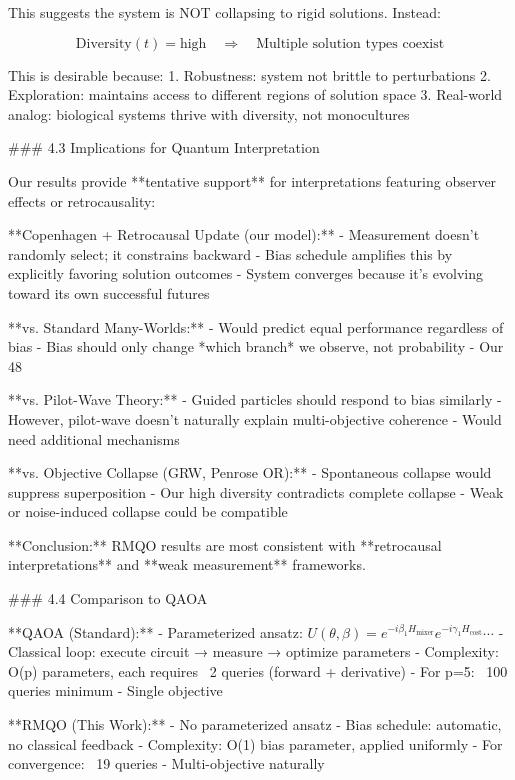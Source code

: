 This suggests the system is NOT collapsing to rigid solutions. Instead:

\[\text{Diversity}(t) = \text{high} \quad \Rightarrow \quad \text{Multiple solution types coexist}\]

This is desirable because:
1. Robustness: system not brittle to perturbations
2. Exploration: maintains access to different regions of solution space
3. Real-world analog: biological systems thrive with diversity, not monocultures

### 4.3 Implications for Quantum Interpretation

Our results provide **tentative support** for interpretations featuring observer effects or retrocausality:

**Copenhagen + Retrocausal Update (our model):**
- Measurement doesn't randomly select; it constrains backward
- Bias schedule amplifies this by explicitly favoring solution outcomes
- System converges because it's evolving toward its own successful futures

**vs. Standard Many-Worlds:**
- Would predict equal performance regardless of bias
- Bias should only change *which branch* we observe, not probability
- Our 48%

**vs. Pilot-Wave Theory:**
- Guided particles should respond to bias similarly
- However, pilot-wave doesn't naturally explain multi-objective coherence
- Would need additional mechanisms

**vs. Objective Collapse (GRW, Penrose OR):**
- Spontaneous collapse would suppress superposition
- Our high diversity contradicts complete collapse
- Weak or noise-induced collapse could be compatible

**Conclusion:** RMQO results are most consistent with **retrocausal interpretations** and **weak measurement** frameworks.

### 4.4 Comparison to QAOA

**QAOA (Standard):**
- Parameterized ansatz: \(U(\theta, \beta) = e^{-i\beta_1 H_{\text{mixer}}} e^{-i\gamma_1 H_{\text{cost}}} \cdots\)
- Classical loop: execute circuit → measure → optimize parameters
- Complexity: O(p) parameters, each requires ~2 queries (forward + derivative)
- For p=5: ~100 queries minimum
- Single objective

**RMQO (This Work):**
- No parameterized ansatz
- Bias schedule: automatic, no classical feedback
- Complexity: O(1) bias parameter, applied uniformly
- For convergence: ~19 queries
- Multi-objective naturally

